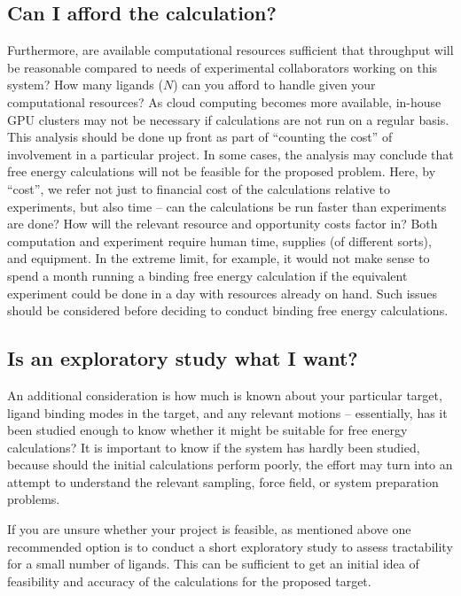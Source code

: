 \documentclass[9pt,bestpractices]{livecoms}
\begin{document}
\subsection{Can I afford the calculation?}
\label{subsec:affordability}
Furthermore, are available computational resources sufficient that throughput will be reasonable compared to needs of experimental collaborators working on
this system? How many ligands ($N$) can you afford to handle given
your computational resources? As cloud computing becomes more available, in-house GPU clusters may not be necessary if calculations are not run on a regular basis.
This analysis should be done up front as part of ``counting the cost''
of involvement in a particular project. In some cases, the analysis may conclude that free energy calculations will not be feasible for the proposed problem.
Here, by ``cost'', we refer not just to financial cost of the calculations relative to experiments, but also time -- can the calculations be run faster than experiments are done? How will the relevant resource and opportunity costs factor in? Both computation and experiment require human time, supplies (of different sorts), and equipment. In the extreme limit, for example, it would not make sense to spend a month running a binding free energy calculation if the equivalent experiment could be done in a day with resources already on hand. Such issues should be considered before deciding to conduct binding free energy calculations.

\subsection{Is an exploratory study what I want?}
\label{subsec:exploration}
An additional consideration is how much is known about your particular
target, ligand binding modes in the target, and any relevant motions
-- essentially, has it been studied enough to know whether it might be
suitable for free energy calculations? It is important to know if the system has hardly been studied, because should the initial calculations perform poorly, the effort may turn into an attempt to understand the relevant sampling, force field, or system preparation problems.

If you are unsure whether your project is feasible, as mentioned above one recommended option is to conduct a short exploratory study to assess tractability for a small
number of ligands. This can be sufficient to get an initial
idea of feasibility and accuracy of the calculations for the
proposed target.
%
\end{document}
